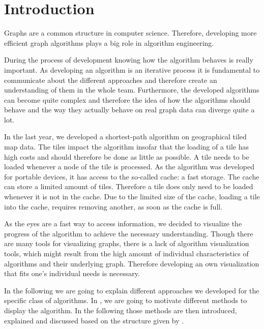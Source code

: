 \documentclass
[
    paper = a4,
    pagesize,
    12 pt,
    oneside,                       %
    open = right,
    DIV = calc,
    BCOR = 0 mm,                   %
    bibtotoc
]
{scrbook}
\begin{document}
\frontmatter







\mainmatter
\chapter{Introduction} \label{introduction}
Graphs are a common structure in computer science.
Therefore, developing more efficient graph algorithms plays a big role in algorithm engineering.

During the process of development knowing how the algorithm behaves is really important.
As developing an algorithm is an iterative process it is fundamental to communicate about the different approaches and therefore create an understanding of them in the whole team.
Furthermore, the developed algorithms can become quite complex and therefore the idea of how the algorithms should behave and the way they actually behave on real graph data can diverge quite a lot.

In the last year, we developed a shortest-path algorithm on geographical tiled map data.
The tiles impact the algorithm insofar that the loading of a tile has high costs and should therefore be done as little as possible.
A tile needs to be loaded whenever a node of the tile is processed.
As the algorithm was developed for portable devices, it has access to the so-called cache: a fast storage.
The cache can store a limited amount of tiles.
Therefore a tile does only need to be loaded whenever it is not in the cache.
Due to the limited size of the cache, loading a tile into the cache, requires removing another, as soon as the cache is full.

As the eyes are a fast way to access information, we decided to visualize the progress of the algorithm to achieve the necessary understanding.
Though there are many tools for visualizing graphs, there is a lack of algorithm visualization tools, which might result from the high amount of individual characteristics of algorithms and their underlying graph.
Therefore developing an own visualization that fits one's individual needs is necessary.

In the following we are going to explain different approaches we developed for the specific class of algorithms.
In , we are going to motivate different methods to display the algorithm.
In the following  those methods are then introduced, explained and discussed based on the structure given by .
\end{document}
